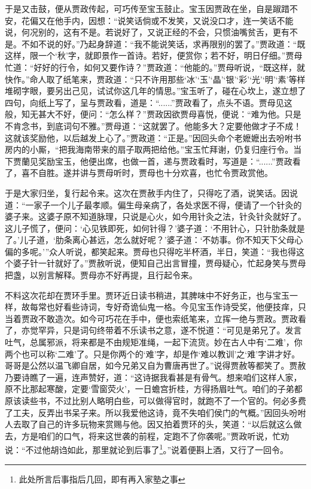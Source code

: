 \documentclass[12pt,oneside]{book}
\begin{document}
于是又击鼓，便从贾政传起，可巧传至宝玉鼓止。宝玉因贾政在坐，自是踧踖不安，花偏又在他手内，因想：“说笑话倘或不发笑，又说没口才，连一笑话不能说，何况别的，这有不是。若说好了，又说正经的不会，只惯油嘴贫舌，更有不是。不如不说的好。”乃起身辞道：“我不能说笑话，求再限别的罢了。”贾政道：“既这样，限一个‘秋’字，就即景作一首诗。若好，便赏你；若不好，明日仔细。”贾母忙道：“好好的行令，如何又要作诗？”贾政道：“他能的。”贾母听说，“既这样，就快作。”命人取了纸笔来，贾政道：“只不许用那些‘冰’‘玉’‘晶’‘银’‘彩’‘光’‘明’‘素’等样堆砌字眼，要另出己见，试试你这几年的情思。”宝玉听了，碰在心坎上，遂立想了四句，向纸上写了，呈与贾政看，道是：“......”贾政看了，点头不语。贾母见这般，知无甚大不好，便问：“怎么样？”贾政因欲贾母喜悦，便说：“难为他。只是不肯念书，到底词句不雅。”贾母道：“这就罢了。他能多大？定要他做才子不成！这就该奖励他，以后越发上心了。”贾政道：“正是。”因回头命个老嬷嬷出去吩咐书房内的小厮，“把我海南带来的扇子取两把给他。”宝玉忙拜谢，仍复归座行令。当下贾蘭见奖励宝玉，他便出席，也做一首，递与贾政看时，写道是：“......”贾政看了，喜不自胜。遂并讲与贾母听时，贾母也十分欢喜，也忙令贾政赏他。

于是大家归坐，复行起令来。这次在贾赦手内住了，只得吃了酒，说笑话。因说道：“一家子一个儿子最孝顺。偏生母亲病了，各处求医不得，便请了一个针灸的婆子来。这婆子原不知道脉理，只说是心火，如今用针灸之法，针灸针灸就好了。这儿子慌了，便问：‘心见铁即死，如何针得？’婆子道：‘不用针心，只针肋条就是了。’儿子道，‘肋条离心甚远，怎么就好呢？’婆子道：‘不妨事。你不知天下父母心偏的多呢。’”众人听说，都笑起来。贾母也只得吃半杯酒，半日，笑道：“我也得这个婆子针一针就好了。”贾赦听说，便知自己出言冒撞，贾母疑心，忙起身笑与贾母把盏，以别言解释。贾母亦不好再提，且行起令来。

不料这次花却在贾环手里。贾环近日读书稍进，其脾味中不好务正，也与宝玉一样，故每常也好看些诗词，专好奇诡仙鬼一格。今见宝玉作诗受奖，他便技痒，只当着贾政不敢造次。如今可巧花在手中，便也索纸笔来，立挥一绝与贾政。贾政看了，亦觉罕异，只是词句终带着不乐读书之意，遂不悦道：“可见是弟兄了。发言吐气，总属邪派，将来都是不由规矩准绳，一起下流货。妙在古人中有‘二难’，你两个也可以称‘二难’了。只是你两个的‘难’字，却是作‘难以教训’之‘难’字讲才好。哥哥是公然以温飞卿自居，如今兄弟又自为曹唐再世了。”说得贾赦等都笑了。贾赦乃要诗瞧了一遍，连声赞好，道：“这诗据我看甚是有骨气。想来咱们这样人家，原不比那起寒酸，定要‘雪窗荧火’，一日蟾宫折桂，方得扬眉吐气。咱们的子弟都原该读些书，不过比别人略明白些，可以做得官时，就跑不了一个官的。何必多费了工夫，反弄出书呆子来。所以我爱他这诗，竟不失咱们侯门的气概。”因回头吩咐人去取了自己的许多玩物来赏赐与他。因又拍着贾环的头，笑道：“以后就这么做去，方是咱们的口气，将来这世袭的前程，定跑不了你袭呢。”贾政听说，忙劝说：“不过他胡诌如此，那里就论到后事了\footnote{此处所言后事指后几回，即有再入家塾之事}。”说着便斟上酒，又行了一回令。
\end{document}
